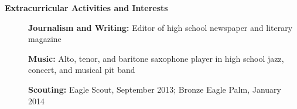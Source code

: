 \documentclass[letterpaper,10.8pt]{article}
\newcommand{\resheading}[1]{{\large \colorbox{mygrey}{\begin{minipage}{\textwidth}{\textbf{#1 \vphantom{p\^{E}}}}\end{minipage}}}}
\begin{document}
\resheading{Extracurricular Activities and Interests}
{\small
	\begin{description}
		\item[] \hspace{0.03in} \textbf{Journalism and Writing:} { \footnotesize Editor of high school newspaper and literary magazine}
		\item[] \hspace{0.03in} \textbf{Music:} {\footnotesize Alto, tenor, and baritone saxophone player in high school jazz, concert, and musical pit band}
		\item[] \hspace{0.03in} \textbf{Scouting:} {\footnotesize Eagle Scout, September 2013; Bronze Eagle Palm, January 2014}
	\end{description}}
\end{document}
